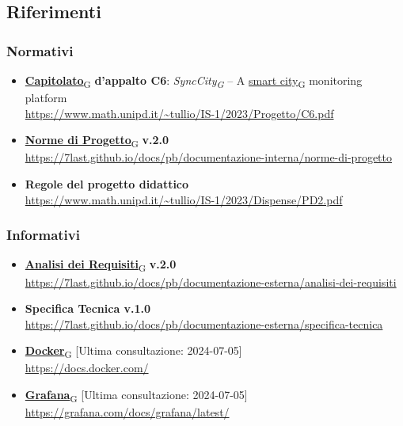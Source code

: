 \subsection{Riferimenti}
    \subsubsection{Normativi}
        \begin{itemize}
            \item \href{https://7last.github.io/docs/pb/documentazione-interna/glossario\#capitolato}{\textbf{Capitolato}\textsubscript{G}}\textbf{ d'appalto C6}: \textit{SyncCity\textsubscript{G} } – A \href{https://7last.github.io/docs/pb/documentazione-interna/glossario\#smart-city}{smart city\textsubscript{G}} monitoring platform\\
            \url{https://www.math.unipd.it/~tullio/IS-1/2023/Progetto/C6.pdf}
            \item \href{https://7last.github.io/docs/pb/documentazione-interna/glossario\#norme-di-progetto}{\textbf{Norme di Progetto}\textsubscript{G}}\textbf{ v.2.0}\\
            \url{https://7last.github.io/docs/pb/documentazione-interna/norme-di-progetto}
            \item \textbf{Regole del progetto didattico}\\
            \url{https://www.math.unipd.it/~tullio/IS-1/2023/Dispense/PD2.pdf}
        \end{itemize}
    \subsubsection{Informativi}
        \begin{itemize}
            \item \href{https://7last.github.io/docs/pb/documentazione-interna/glossario\#analisi-dei-requisiti}{\textbf{Analisi dei Requisiti}\textsubscript{G}}\textbf{ v.2.0}\\
            \url{https://7last.github.io/docs/pb/documentazione-esterna/analisi-dei-requisiti}
            \item \textbf{Specifica Tecnica v.1.0}\\
            \url{https://7last.github.io/docs/pb/documentazione-esterna/specifica-tecnica}
            \item \href{https://7last.github.io/docs/pb/documentazione-interna/glossario\#docker}{\textbf{Docker}\textsubscript{G}} [Ultima consultazione: 2024-07-05]\\ \url{https://docs.docker.com/} 
            \item \href{https://7last.github.io/docs/pb/documentazione-interna/glossario\#grafana}{\textbf{Grafana}\textsubscript{G}} [Ultima consultazione: 2024-07-05]\\ \url{https://grafana.com/docs/grafana/latest/}
        \end{itemize}
    